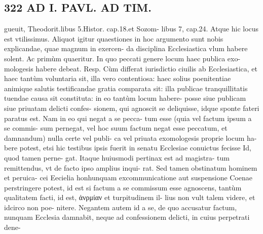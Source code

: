 \documentclass{article}
\begin{document}
\begin{pages}
\section*{322 AD I. PAVL. AD TIM. }\pstart gueuit, Theodorit.libus 5.Histor. cap.18.et Sozom- libus 7, cap.24. Atque hic locus est vtilissimus.  \pend\pstart Aliquot igitur quaestiones in hoc argumento sunt nobis explicandae, quae magnum in exercen- da disciplina Ecclesiastica vlum habere solent. Ac primùm quaeritur.  \pend\pstart In quo peccati genere locum haec publica exo- mologesis habere debeat. Resp. Cùm differat iurisdictio ciuilis ab Ecclesiastica, et haec tantùm voluntaria sit, illa vero contentiosa: haec solius poenitentiae animique salutis testificandae gratia comparata sit: illa publicae tranquillitatis tuendae causa sit constituta: in eo tantùm locum habere- posse siue publicam siue priuatam delicti confes- sionem, qui agnoscit se deliquisse, idque sponte fateri paratus est. Nam in eo qui negat a se pecca- tum esse (quia vel factum ipsum a se commis- sum pernegat, vel hoc suum factum negat esse peccatum, et damnandum) nulla certe vel publi- ca vel priuata exomologesis proprie locum ha- bere potest, etsi hic testibus ipsis fuerit in senatu Ecclesiae conuictus fecisse Id, quod tamen perne- gat. Itaque huiusmodi pertinax est ad magistra- tum remittendus, vt de facto ipso amplius inqui- rat. Sed tamen obstinatum hominem et peruica- cei Eecielia honhunquam excommunicatione aut suspensione Coenae perstringere potest, id est si factum a se commissum esse agnoscens, tantùm qualitatem facti, id est, ἀνρμίαν et turpitudinem il- lius non vult talem videre, et idcirco non poe- nitere. Negantem autem id a se, de quo accusatur factum, nunquam Ecclesia damnabit, neque ad confessionem delicti, in cuius perpetrati dene-  \pend

\end{pages}
\end{document}
